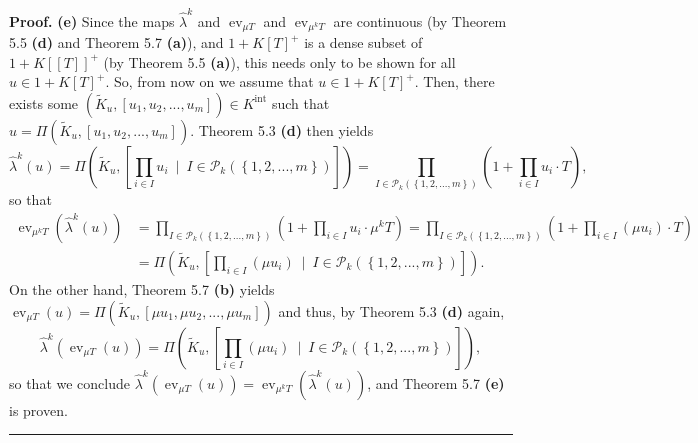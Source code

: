 \documentclass[numbers=enddot,12pt,final,onecolumn,notitlepage]{scrartcl}%
\newenvironment{proof}[1][Proof]{\noindent\textbf{#1.} }{\ \rule{0.5em}{0.5em}}
\begin{document}
\begin{proof}
\textbf{(e)} Since the maps $\widehat{\lambda}^{k}$ and $\operatorname*{ev}%
_{\mu T}$ and $\operatorname*{ev}\nolimits_{\mu^{k}T}$ are continuous (by
Theorem 5.5 \textbf{(d) }and Theorem 5.7 \textbf{(a)}), and $1+K\left[
T\right]  ^{+}$ is a dense subset of $1+K\left[  \left[  T\right]  \right]
^{+}$ (by Theorem 5.5 \textbf{(a)}), this needs only to be shown for all
$u\in1+K\left[  T\right]  ^{+}$. So, from now on we assume that $u\in
1+K\left[  T\right]  ^{+}$. Then, there exists some $\left(  \widetilde{K}%
_{u},\left[  u_{1},u_{2},...,u_{m}\right]  \right)  \in K^{\operatorname*{int}%
}$ such that $u=\Pi\left(  \widetilde{K}_{u},\left[  u_{1},u_{2}%
,...,u_{m}\right]  \right)  $. Theorem 5.3 \textbf{(d)} then yields%
\[
\widehat{\lambda}^{k}\left(  u\right)  =\Pi\left(  \widetilde{K}_{u},\left[
\prod\limits_{i\in I}u_{i}\ \mid\ I\in\mathcal{P}_{k}\left(  \left\{
1,2,...,m\right\}  \right)  \right]  \right)  =\prod\limits_{I\in
\mathcal{P}_{k}\left(  \left\{  1,2,...,m\right\}  \right)  }\left(
1+\prod\limits_{i\in I}u_{i}\cdot T\right)  ,
\]
so that%
\begin{align*}
\operatorname*{ev}\nolimits_{\mu^{k}T}\left(  \widehat{\lambda}^{k}\left(
u\right)  \right)   &  =\prod\limits_{I\in\mathcal{P}_{k}\left(  \left\{
1,2,...,m\right\}  \right)  }\left(  1+\prod\limits_{i\in I}u_{i}\cdot\mu
^{k}T\right)  =\prod\limits_{I\in\mathcal{P}_{k}\left(  \left\{
1,2,...,m\right\}  \right)  }\left(  1+\prod\limits_{i\in I}\left(  \mu
u_{i}\right)  \cdot T\right) \\
&  =\Pi\left(  \widetilde{K}_{u},\left[  \prod\limits_{i\in I}\left(  \mu
u_{i}\right)  \ \mid\ I\in\mathcal{P}_{k}\left(  \left\{  1,2,...,m\right\}
\right)  \right]  \right)  .
\end{align*}
On the other hand, Theorem 5.7 \textbf{(b)} yields $\operatorname*{ev}_{\mu
T}\left(  u\right)  =\Pi\left(  \widetilde{K}_{u},\left[  \mu u_{1},\mu
u_{2},...,\mu u_{m}\right]  \right)  $ and thus, by Theorem 5.3 \textbf{(d)}
again,%
\[
\widehat{\lambda}^{k}\left(  \operatorname*{ev}\nolimits_{\mu T}\left(
u\right)  \right)  =\Pi\left(  \widetilde{K}_{u},\left[  \prod\limits_{i\in
I}\left(  \mu u_{i}\right)  \ \mid\ I\in\mathcal{P}_{k}\left(  \left\{
1,2,...,m\right\}  \right)  \right]  \right)  ,
\]
so that we conclude $\widehat{\lambda}^{k}\left(  \operatorname*{ev}_{\mu
T}\left(  u\right)  \right)  =\operatorname*{ev}_{\mu^{k}T}\left(
\widehat{\lambda}^{k}\left(  u\right)  \right)  $, and Theorem 5.7
\textbf{(e)} is proven.
\end{proof}
\end{document}
